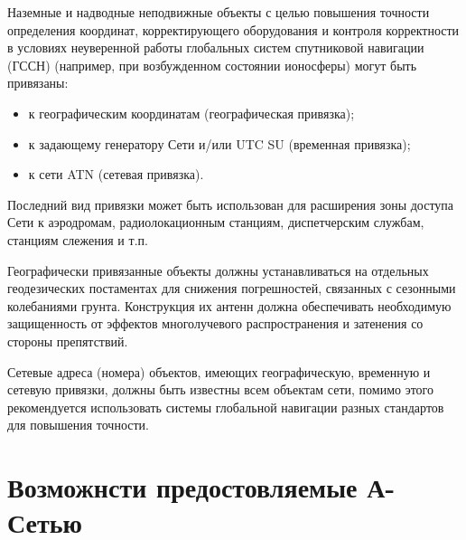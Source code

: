 \documentclass[a4paper,12pt]{report} %
\begin{document}
Наземные и надводные неподвижные объекты с целью повышения точности определения
координат, корректирующего оборудования и контроля корректности в условиях
неуверенной работы глобальных систем спутниковой навигации (ГССН) (например, при
возбужденном состоянии ионосферы) могут быть привязаны:
\begin{itemize}
\item к географическим координатам (географическая привязка);
\item к задающему генератору Сети и/или UTC SU (временная привязка);
\item к сети ATN (сетевая привязка).
\end{itemize}
Последний вид привязки может быть использован для расширения зоны доступа
Сети к аэродромам, радиолокационным станциям, диспетчерским службам, станциям
слежения и т.п.

Географически привязанные объекты должны устанавливаться на отдельных
геодезических постаментах для снижения погрешностей, связанных с сезонными
колебаниями грунта. Конструкция их антенн должна обеспечивать необходимую
защищенность от эффектов многолучевого распространения и затенения со стороны
препятствий.

Сетевые адреса (номера) объектов, имеющих географическую, временную и сетевую
привязки, должны быть известны всем объектам сети, помимо этого рекомендуется
использовать системы глобальной навигации разных стандартов для повышения
точности.

\section{Возможнсти предостовляемые А-Сетью}
\end{document}
